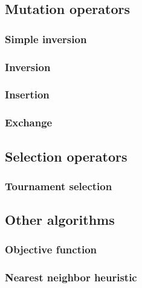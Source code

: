 \documentclass[a4paper,english,11pt,]{scrartcl}
\begin{document}
\subsection{Mutation operators} 
\label{appendix:mutation}
\subsubsection{Simple inversion}
 

\subsubsection{Inversion}
 

\subsubsection{Insertion}
 

\subsubsection{Exchange}
 



\clearpage
\subsection{Selection operators} 
\label{appendix:selection}

\subsubsection{Tournament selection}
 


\subsection{Other algorithms}
\subsubsection{Objective function}
 
\subsubsection{Nearest neighbor heuristic}
 

\clearpage

\makeatletter
\def\url@leostyle{%
  \@ifundefined{selectfont}{\def\UrlFont{\sf}}{\def\UrlFont{\small\ttfamily}}}
\makeatother


\end{document}
